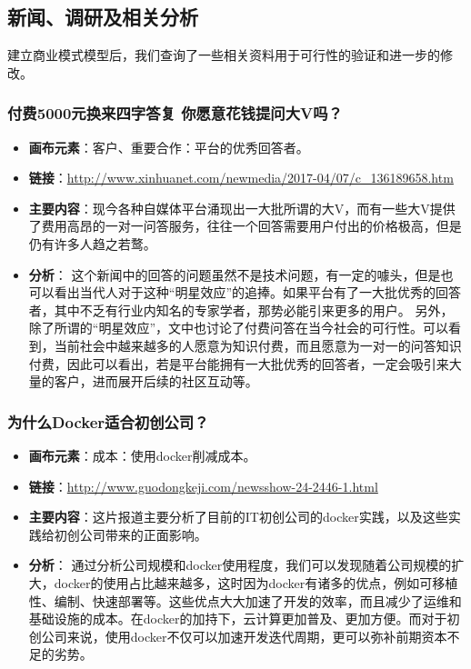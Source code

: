 \documentclass[a4paper]{ctexart}
\begin{document}
\subsection{新闻、调研及相关分析}

建立商业模式模型后，我们查询了一些相关资料用于可行性的验证和进一步的修改。

\subsubsection{付费5000元换来四字答复 你愿意花钱提问大V吗？}
\begin{itemize}
  \item \textbf{画布元素}：客户、重要合作：平台的优秀回答者。
  \item \textbf{链接}：\url{http://www.xinhuanet.com/newmedia/2017-04/07/c_136189658.htm}
  \item \textbf{主要内容}：现今各种自媒体平台涌现出一大批所谓的大V，而有一些大V提供了费用高昂的一对一问答服务，往往一个回答需要用户付出的价格极高，但是仍有许多人趋之若鹜。
  \item \textbf{分析}：  这个新闻中的回答的问题虽然不是技术问题，有一定的噱头，但是也可以看出当代人对于这种“明星效应”的追捧。如果平台有了一大批优秀的回答者，其中不乏有行业内知名的专家学者，那势必能引来更多的用户。
  另外，除了所谓的“明星效应”，文中也讨论了付费问答在当今社会的可行性。可以看到，当前社会中越来越多的人愿意为知识付费，而且愿意为一对一的问答知识付费，因此可以看出，若是平台能拥有一大批优秀的回答者，一定会吸引来大量的客户，进而展开后续的社区互动等。
\end{itemize}

\subsubsection{为什么Docker适合初创公司？}
\begin{itemize}
  \item \textbf{画布元素}：成本：使用docker削减成本。
  \item \textbf{链接}：\url{http://www.guodongkeji.com/newsshow-24-2446-1.html}
  \item \textbf{主要内容}：这片报道主要分析了目前的IT初创公司的docker实践，以及这些实践给初创公司带来的正面影响。
  \item \textbf{分析}：  通过分析公司规模和docker使用程度，我们可以发现随着公司规模的扩大，docker的使用占比越来越多，这时因为docker有诸多的优点，例如可移植性、编制、快速部署等。这些优点大大加速了开发的效率，而且减少了运维和基础设施的成本。在docker的加持下，云计算更加普及、更加方便。而对于初创公司来说，使用docker不仅可以加速开发迭代周期，更可以弥补前期资本不足的劣势。
\end{itemize}
\end{document}
